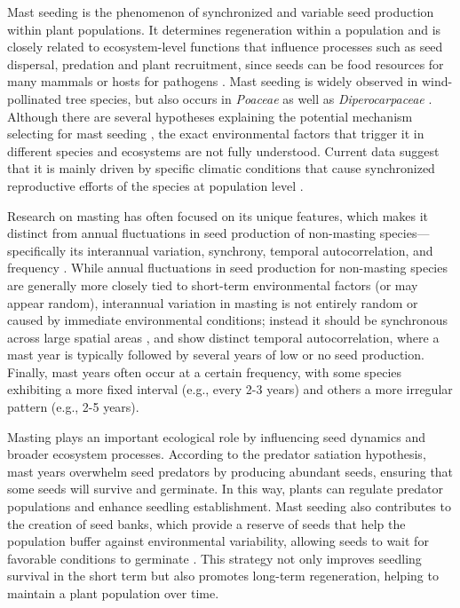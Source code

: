 \documentclass[11pt,letter]{article}
\begin{document}
Mast seeding is the phenomenon of synchronized and variable seed production within plant populations. It determines regeneration within a population and is closely related to ecosystem-level functions that influence processes such as seed dispersal, predation and plant recruitment, since seeds can be food resources for many mammals or hosts for pathogens  \citep{davies2024seed, janzen1971seed, kelly1994evolutionary}. Mast seeding is widely observed in wind-pollinated tree species, but also occurs in \textit{Poaceae} as well as \textit{Diperocarpaceae} \citep{kelly2002mast}. Although there are several hypotheses explaining the potential mechanism selecting for mast seeding  \citep[e.g., predator satiation, resource matching, \textit{etc.}, discussed more in Chapter 2,][]{koenig2021brief}, the exact environmental factors that trigger it in different species and ecosystems are not fully understood. Current data suggest that it is mainly driven by specific climatic conditions that cause synchronized reproductive efforts of the species at population level  \citep{pearse2016mechanisms}. \par

Research on masting has often focused on its unique features, which makes it distinct from annual fluctuations in seed production of non-masting species---specifically its interannual variation, synchrony, temporal autocorrelation, and frequency \citep{hacket2021climate}. While annual fluctuations in seed production for non-masting species are generally more closely tied to short-term environmental factors (or may appear random), interannual variation in masting is not entirely random or caused by immediate environmental conditions; instead it should be synchronous across large spatial areas \citep[e.g., hundreds of kilometers,][]{kelly1994evolutionary}, and show distinct temporal autocorrelation, where a mast year is typically followed by several years of low or no seed production. Finally, mast years often occur at a certain frequency, with some species exhibiting a more fixed interval (e.g., every 2-3 years) and others a more irregular pattern (e.g., 2-5 years). \par

Masting plays an important ecological role by influencing seed dynamics and broader ecosystem processes. According to the predator satiation hypothesis, mast years overwhelm seed predators by producing abundant seeds, ensuring that some seeds will survive and germinate. In this way, plants can regulate predator populations and enhance seedling establishment. Mast seeding also contributes to the creation of seed banks, which provide a reserve of seeds that help the population buffer against environmental variability, allowing seeds to wait for favorable conditions to germinate \citep{venable1989modeling}. This strategy not only improves seedling survival in the short term but also promotes long-term regeneration, helping to maintain a plant population over time.\par
\end{document}
